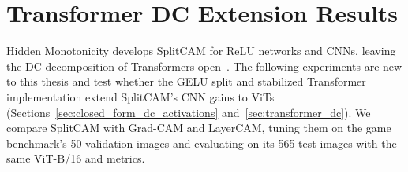 \section{Transformer DC Extension Results}
\label{sec:vit-extension}

Hidden Monotonicity develops SplitCAM for ReLU networks and CNNs, leaving the DC decomposition of Transformers open~\parencite{hiddenMono}. The following experiments are new to this thesis and test whether the GELU split and stabilized Transformer implementation extend SplitCAM's CNN gains to ViTs (Sections~\ref{sec:closed_form_dc_activations} and~\ref{sec:transformer_dc}). We compare SplitCAM with Grad-CAM and LayerCAM, tuning them on the game benchmark's 50 validation images and evaluating on its 565 test images with the same ViT-B/16 and metrics.

